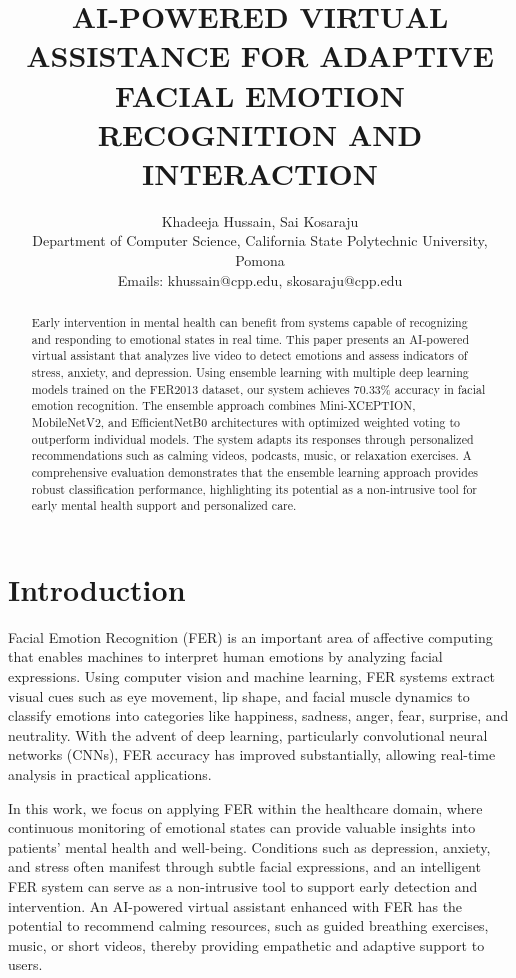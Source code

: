 \documentclass[conference]{IEEEtran}
\title{AI-POWERED VIRTUAL ASSISTANCE FOR ADAPTIVE FACIAL EMOTION RECOGNITION AND INTERACTION}
\author{
Khadeeja Hussain, Sai Kosaraju \\
Department of Computer Science, California State Polytechnic University, Pomona \\
Emails: khussain@cpp.edu, skosaraju@cpp.edu
}
\begin{document}
\maketitle

\begin{abstract}
Early intervention in mental health can benefit from systems capable of recognizing and responding to emotional states in real time. This paper presents an AI-powered virtual assistant that analyzes live video to detect emotions and assess indicators of stress, anxiety, and depression. Using ensemble learning with multiple deep learning models trained on the FER2013 dataset, our system achieves 70.33\% accuracy in facial emotion recognition. The ensemble approach combines Mini-XCEPTION, MobileNetV2, and EfficientNetB0 architectures with optimized weighted voting to outperform individual models. The system adapts its responses through personalized recommendations such as calming videos, podcasts, music, or relaxation exercises. A comprehensive evaluation demonstrates that the ensemble learning approach provides robust classification performance, highlighting its potential as a non-intrusive tool for early mental health support and personalized care.
\end{abstract}

\section{Introduction}
Facial Emotion Recognition (FER) is an important area of affective computing that enables machines to interpret human emotions by analyzing facial expressions. Using computer vision and machine learning, FER systems extract visual cues such as eye movement, lip shape, and facial muscle dynamics to classify emotions into categories like happiness, sadness, anger, fear, surprise, and neutrality. With the advent of deep learning, particularly convolutional neural networks (CNNs), FER accuracy has improved substantially, allowing real-time analysis in practical applications.

In this work, we focus on applying FER within the healthcare domain, where continuous monitoring of emotional states can provide valuable insights into patients' mental health and well-being. Conditions such as depression, anxiety, and stress often manifest through subtle facial expressions, and an intelligent FER system can serve as a non-intrusive tool to support early detection and intervention. An AI-powered virtual assistant enhanced with FER has the potential to recommend calming resources, such as guided breathing exercises, music, or short videos, thereby providing empathetic and adaptive support to users.
\end{document}
